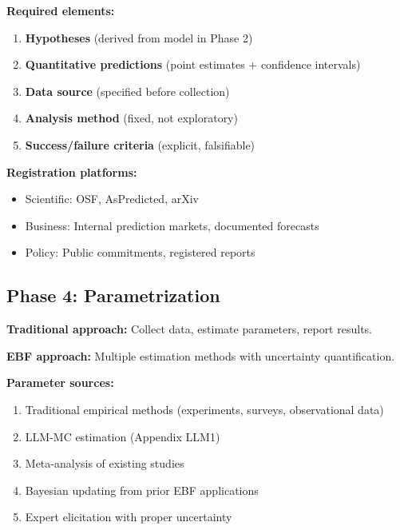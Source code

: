 \begin{tcolorbox}[colback=gray!5!white, colframe=gray!75!black,
    title=\textbf{Phase 3: Pre-Registration Template}]

\textbf{Required elements:}
\begin{enumerate}[nosep]
    \item \textbf{Hypotheses} (derived from model in Phase 2)
    \item \textbf{Quantitative predictions} (point estimates + confidence intervals)
    \item \textbf{Data source} (specified before collection)
    \item \textbf{Analysis method} (fixed, not exploratory)
    \item \textbf{Success/failure criteria} (explicit, falsifiable)
\end{enumerate}

\textbf{Registration platforms:}
\begin{itemize}[nosep]
    \item Scientific: OSF, AsPredicted, arXiv
    \item Business: Internal prediction markets, documented forecasts
    \item Policy: Public commitments, registered reports
\end{itemize}

\end{tcolorbox}

\subsection{Phase 4: Parametrization}

\textbf{Traditional approach:} Collect data, estimate parameters, report results.

\textbf{EBF approach:} Multiple estimation methods with uncertainty quantification.

\textbf{Parameter sources:}
\begin{enumerate}[nosep]
    \item Traditional empirical methods (experiments, surveys, observational data)
    \item LLM-MC estimation (Appendix LLM1)
    \item Meta-analysis of existing studies
    \item Bayesian updating from prior EBF applications
    \item Expert elicitation with proper uncertainty
\end{enumerate}

